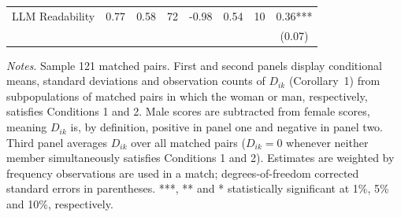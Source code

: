 \begin{table}
\begin{threeparttable}
\begin{tabular}{p{3cm}S[table-format=3.3]@{}S[table-format=3.3]@{}S[table-format=3.2]@{}S[table-format=4.3]@{}S[table-format=3.3]@{}S[table-format=3.1]@{}S@{}}
            LLM Readability               &        0.77&        0.58&          72&       -0.98&        0.54&          10&        0.36***\\
                                          &            &            &            &            &            &            &      (0.07)   \\
            \bottomrule
        \end{tabular}
        \begin{tablenotes}
            \tiny
            \item \textit{Notes}. Sample 121 matched pairs. First and second panels display conditional means, standard deviations and observation counts of \(D_{ik}\) (Corollary~1) from subpopulations of matched pairs in which the woman or man, respectively, satisfies Conditions 1 and 2. Male scores are subtracted from female scores, meaning \(D_{ik}\) is, by definition, positive in panel one and negative in panel two. Third panel averages \(D_{ik}\) over all matched pairs (\(D_{ik}=0\) whenever neither member simultaneously satisfies Conditions 1 and 2). Estimates are weighted by frequency observations are used in a match; degrees-of-freedom corrected standard errors in parentheses. ***, ** and * statistically significant at 1\%, 5\% and 10\%, respectively.
        \end{tablenotes}
    \end{threeparttable}
\end{table}